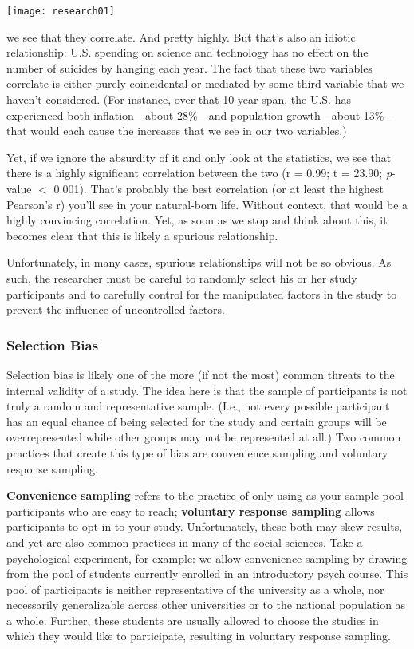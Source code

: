 \texttt{[image: research01]}

we see that they correlate. And pretty highly. But that's also an idiotic relationship: U.S. spending on science and technology has no effect on the number of suicides by hanging each year. The fact that these two variables correlate is either purely coincidental or mediated by some third variable that we haven't considered. (For instance, over that 10-year span, the U.S. has experienced both inflation---about 28\%---and population growth---about 13\%---that would each cause the increases that we see in our two variables.)

Yet, if we ignore the absurdity of it and only look at the statistics, we see that there is a highly significant correlation between the two (r = 0.99; t = 23.90; \textit{p}-value $<$ 0.001). That's probably the best correlation (or at least the highest Pearson's r) you'll see in your natural-born life. Without context, that would be a highly convincing correlation. Yet, as soon as we stop and think about this, it becomes clear that this is likely a spurious relationship.

Unfortunately, in many cases, spurious relationships will not be so obvious. As such, the researcher must be careful to randomly select his or her study participants and to carefully control for the manipulated factors in the study to prevent the influence of uncontrolled factors.

\subsubsection{Selection Bias}
Selection bias is likely one of the more (if not the most) common threats to the internal validity of a study. The idea here is that the sample of participants is not truly a random and representative sample. (I.e., not every possible participant has an equal chance of being selected for the study and certain groups will be overrepresented while other groups may not be represented at all.) Two common practices that create this type of bias are convenience sampling and voluntary response sampling.

\textbf{Convenience sampling} refers to the practice of only using as your sample pool participants who are easy to reach; \textbf{voluntary response sampling} allows participants to opt in to your study. Unfortunately, these both may skew results, and yet are also common practices in many of the social sciences. Take a psychological experiment, for example: we allow convenience sampling by drawing from the pool of students currently enrolled in an introductory psych course. This pool of participants is neither representative of the university as a whole, nor necessarily generalizable across other universities or to the national population as a whole. Further, these students are usually allowed to choose the studies in which they would like to participate, resulting in voluntary response sampling.

